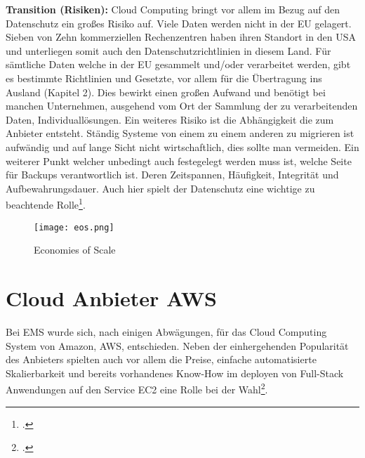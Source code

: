 \textbf{Transition (Risiken):} Cloud Computing bringt vor allem im Bezug auf den Datenschutz ein großes Risiko auf. Viele Daten werden nicht in der EU gelagert. Sieben von Zehn kommerziellen Rechenzentren haben ihren Standort in den USA und unterliegen somit auch den Datenschutzrichtlinien in diesem
Land. Für sämtliche Daten welche in der EU gesammelt und/oder verarbeitet werden, gibt es bestimmte Richtlinien und Gesetzte, vor allem für die Übertragung ins Ausland (Kapitel 2). Dies bewirkt einen großen Aufwand und benötigt bei manchen Unternehmen, ausgehend vom Ort der Sammlung der zu verarbeitenden Daten,
Individuallösungen. Ein weiteres Risiko ist die Abhängigkeit die zum Anbieter entsteht. Ständig Systeme von einem zu einem anderen zu migrieren ist aufwändig und auf lange Sicht nicht wirtschaftlich, dies sollte man vermeiden. Ein weiterer Punkt welcher unbedingt auch festegelegt werden muss ist, welche Seite
für Backups verantwortlich ist. Deren Zeitspannen, Häufigkeit, Integrität und Aufbewahrungsdauer. Auch hier spielt der Datenschutz eine wichtige zu beachtende Rolle\footcite{Lehrunterlagen-HTL-cloud}.
\begin{center}
\begin{figure}[H]
    \centering
    \texttt{[image: eos.png]}
    \caption{Economies of Scale}
\end{figure}
\end{center}
\break

\section{Cloud Anbieter AWS}
Bei EMS wurde sich, nach einigen Abwägungen, für das Cloud Computing System von Amazon, AWS, entschieden. Neben der einhergehenden Popularität des Anbieters spielten auch vor allem die Preise, einfache automatisierte Skalierbarkeit und bereits vorhandenes Know-How im deployen von Full-Stack Anwendungen auf den Service EC2 eine Rolle bei der Wahl\footcite{deploy-nodejs1}.

